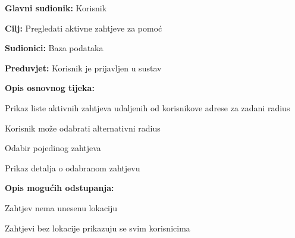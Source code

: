 					\noindent {}
					\begin{packed_item}
	
						\item \textbf{Glavni sudionik: }Korisnik
						\item  \textbf{Cilj:} Pregledati aktivne zahtjeve za pomoć
						\item  \textbf{Sudionici:} Baza podataka
						\item  \textbf{Preduvjet:} Korisnik je prijavljen u sustav
						\item  \textbf{Opis osnovnog tijeka:}
						
						\item[] \begin{packed_enum}
	
							\item Prikaz liste aktivnih zahtjeva udaljenih od korisnikove adrese za zadani radius 
							\item Korisnik može odabrati alternativni radius
							\item Odabir pojedinog zahtjeva
							\item Prikaz detalja o odabranom zahtjevu
						\end{packed_enum}
						
						\item  \textbf{Opis mogućih odstupanja:}
						
						\item[] \begin{packed_item}
	
							\item[1.a] Zahtjev nema unesenu lokaciju
							\item[] \begin{packed_enum}
								
								\item Zahtjevi bez lokacije prikazuju se svim korisnicima
							
							\end{packed_enum}
							
							
						\end{packed_item}
					\end{packed_item}
				
